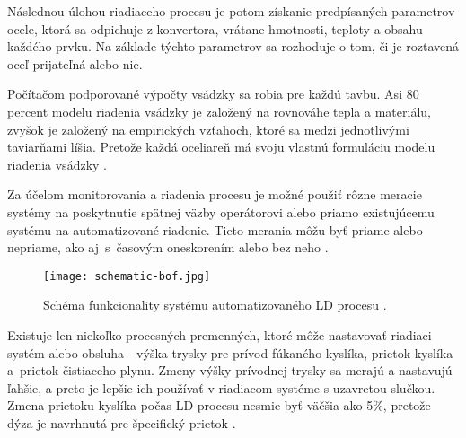 Následnou úlohou riadiaceho procesu je potom získanie predpísaných parametrov ocele, ktorá sa odpichuje z konvertora, vrátane hmotnosti, teploty a obsahu každého prvku. Na základe týchto parametrov sa rozhoduje o tom, či je roztavená oceľ prijateľná alebo nie.

Počítačom podporované výpočty vsádzky sa robia pre každú tavbu. Asi 80 percent modelu riadenia vsádzky je založený na rovnováhe tepla a materiálu, zvyšok je založený na empirických vzťahoch, ktoré sa medzi jednotlivými taviarňami líšia. Pretože každá oceliareň má svoju vlastnú formuláciu modelu riadenia vsádzky \cite{Turkdogan1996}.

Za účelom monitorovania a riadenia procesu je možné použiť rôzne meracie systémy na poskytnutie spätnej väzby operátorovi alebo priamo existujúcemu systému na automatizované riadenie. Tieto merania môžu byť priame alebo nepriame, ako aj~s~časovým oneskorením alebo bez neho \cite{Widlund1998}.

\begin{figure}[h!]
\centering
\texttt{[image: schematic-bof.jpg]}
\caption{Schéma funkcionality systému automatizovaného LD procesu \citep{Turkdogan1996}.}
\label{o:21}
\end{figure}

Existuje len niekoľko procesných premenných, ktoré môže nastavovať riadiaci systém alebo obsluha - výška trysky pre prívod fúkaného kyslíka, prietok kyslíka a~prietok čistiaceho plynu. Zmeny výšky prívodnej trysky sa merajú a nastavujú ľahšie, a preto je lepšie ich používať v riadiacom systéme s uzavretou slučkou. Zmena prietoku kyslíka počas LD procesu nesmie byť väčšia ako 5\%, pretože dýza je navrhnutá pre špecifický prietok \cite{Widlund1998}.